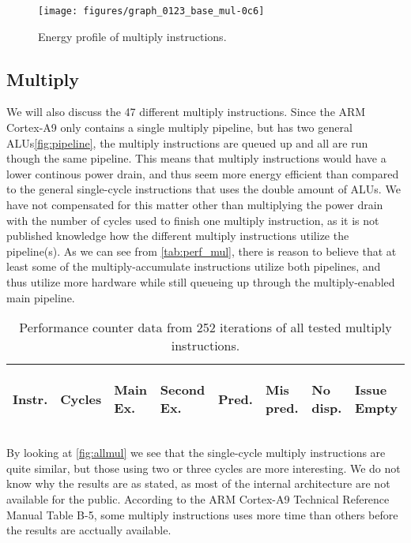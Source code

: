 \begin{figure*}
    \centering
    \texttt{[image: figures/graph\_0123\_base\_mul-0c6]}
    \caption{Energy profile of multiply instructions.}
    \label{fig:allmul}
\end{figure*}

\subsection{Multiply}
We will also discuss the 47 different multiply instructions. Since the ARM
Cortex-A9 only contains a single multiply pipeline, but has two general
ALUs\autoref{fig:pipeline}, the multiply instructions are queued up and all are run
though the same pipeline. This means that multiply instructions would have a
lower continous power drain, and thus seem more energy efficient than compared
to the general single-cycle instructions that uses the double amount of ALUs. We
have not compensated for this matter other than multiplying the power drain with
the number of cycles used to finish one multiply instruction, as it is not
published knowledge how the different multiply instructions utilize the
pipeline(s). As we can see from \autoref{tab:perf_mul}, there is reason to
believe that at least some of the multiply-accumulate instructions utilize both
pipelines\cite{ramangcc}, and thus utilize more hardware while still queueing up
through the multiply-enabled main pipeline.

\begin{table}
    \centering
    \begin{tabular}{|p{0.7cm}|R{0.8cm}R{0.6cm}R{0.85cm}R{0.6cm}R{0.45cm}R{0.75cm}R{0.72cm}|}
        \hline
        \centering
        Instr. &
        \centering
        Cycles &
        \centering
        Main Ex. &
        \centering
        Second Ex. &
        \centering
        Pred.&
        \centering
        Mis pred.&
        \centering
        No disp. &
        \begin{centering}
        Issue Empty
        \end{centering}
        \\
        \hline
        
        \hline
    \end{tabular}
    \caption{Performance counter data from 252 iterations of all tested multiply
    instructions.}
    \label{tab:perf_mul}
\end{table}


By looking at \autoref{fig:allmul} we see that the single-cycle multiply
instructions are quite similar, but those using two or three cycles are more
interesting. We do not know why the results are as stated, as most of the
internal architecture are not available for the public. According to the ARM
Cortex-A9 Technical Reference Manual Table B-5, some multiply instructions uses
more time than others before the results are acctually available\cite{armtech}.

